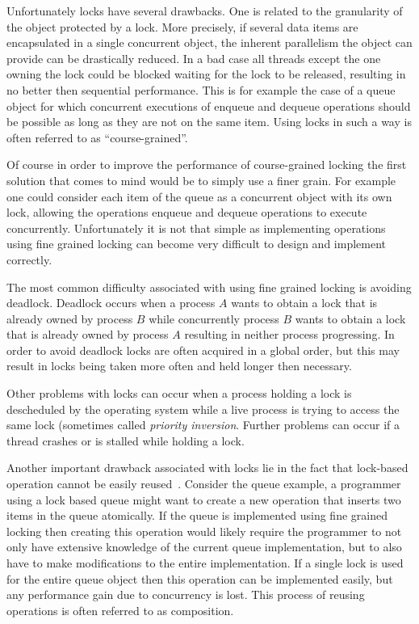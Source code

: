 Unfortunately locks have several drawbacks. One is related to the  granularity
of the object protected by a lock. More precisely, if several data items 
are encapsulated  in a single  concurrent  object, the
inherent parallelism  the object can provide 
can be drastically reduced.
In a bad case all threads except the one owning the lock could be blocked waiting
for the lock to be released, resulting in no better then sequential performance.
This  is for example the case of a queue 
object for which concurrent executions of enqueue and dequeue operations 
should be possible as long as they are not on the same item.
Using locks in such a way is often referred to as ``course-grained''.

Of course in order to improve the performance of course-grained locking
the first solution that comes to mind would be to simply
use a finer grain.  For example one could consider
each item of the queue as  a concurrent object with its own lock,
allowing the  operations  enqueue  
and  dequeue  operations to execute concurrently.
Unfortunately it is not that simple as implementing operations using
fine grained locking can  become very   difficult  to  design and implement
correctly.

The most common difficulty associated with using fine grained locking
is avoiding deadlock.
Deadlock occurs when a process $A$ wants to obtain a lock that
is already owned by process $B$ while concurrently process $B$ wants
to obtain a lock that is already owned by process $A$ resulting
in neither process progressing.
In order to avoid deadlock locks are often acquired in a global order,
but this may result in locks being taken more often and held longer then necessary.

Other problems with locks can occur when a process holding a lock
is descheduled by the operating system while a live process is trying to
access the same lock (sometimes called \emph{priority inversion}.
Further problems can occur if a thread crashes or is stalled while
holding a lock.

Another important drawback associated with locks lie in the fact that 
lock-based operation cannot be easily reused~\cite{HMPH05,GG11}.
Consider the queue example, a programmer using a lock based queue
might want to create a new operation that inserts two items in the queue
atomically.
If the queue is implemented using fine grained locking then creating this operation
would likely require the programmer to not only have extensive knowledge of the current
queue implementation, but to also have to make modifications to the entire implementation.
If a single lock is used for the entire queue object then this operation can be implemented
easily, but any performance gain due to concurrency is lost.
This process of reusing operations is often referred to as composition.



